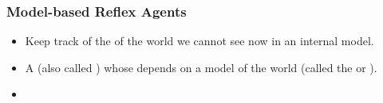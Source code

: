 \documentclass[notes,mh]{mikoslides}
\begin{document}
\begin{module}[id=model-based-agent]
  \begin{frame}
  \frametitle{Model-based Reflex Agents}
  \begin{itemize}
  \item 
    \begin{omtext}[title=Idea]
      Keep track of the  of the world we cannot see now in an internal model.
    \end{omtext}
  \item 
    \begin{definition}
      A  (also called
      ) whose
       depends on a model of the world (called the
       or ).
    \end{definition}
  \item
    \begin{omtext}[title=Agent Schema]
    \end{omtext}
  \end{itemize}
\end{frame}
\end{module}
\end{document}
